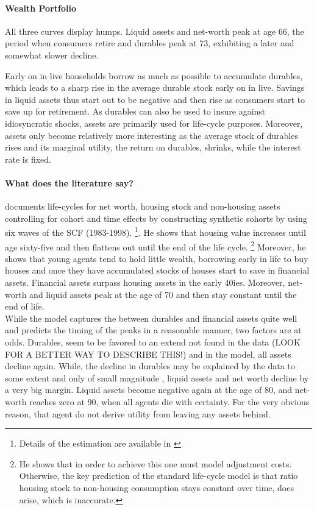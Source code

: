 \documentclass[a4paper,12pt]{article}
\begin{document}
\paragraph{Wealth Portfolio} All three curves display humps. Liquid assets and net-worth peak at age 66, the period when consumers retire and durables peak at 73, exhibiting a later and somewhat slower decline. 

Early on in live households borrow as much as possible to accumulate durables, which leads to a sharp rise in the average durable stock early on in live. Savings in liquid assets thus start out to be negative and then rise as consumers start to save up for retirement. As durables can also be used to insure against idiosyncratic shocks, assets are primarily used for life-cycle purposes. Moreover, assets only become relatively more interesting as the average stock of durables rises and its marginal utility, the return on durables, shrinks, while the interest rate is fixed. 

\paragraph{What does the literature say?} \cite{yang2009} documents life-cycles for net worth, housing stock and non-housing assets controlling for cohort and time effects by constructing synthetic sohorts by using six waves of the SCF (1983-1998). \footnote{Details of the estimation are available in \cite{yang2009}}. He shows that housing value increases until age sixty-five and then flattens out until the end of the life cycle. \footnote{He shows that in order to achieve this one must model adjustment costs. Otherwise, the key prediction of the standard life-cycle model is that ratio housing stock to non-housing consumption stays constant over time, does arise, which is inaccurate. } Moreover, he shows that young agents tend to hold little wealth, borrowing early in life to buy houses and once they have accumulated stocks of houses start to save in financial assets. Financial assets surpass housing assets in the early 40ies. Moreover, net-worth and liquid assets peak at the age of 70 and then stay constant until the end of life. \\

While the model captures the between durables and financial assets quite well and predicts the timing of the peaks in a reasonable manner, two factors are at odds. Durables, seem to be favored to an extend not found in the data (LOOK FOR A BETTER WAY TO DESCRIBE THIS!) and in the model, all assets decline again. While, the decline in durables may be explained by the data to some extent and only of small magnitude \citep{FV&K2011}, liquid assets and net worth decline by a very big margin. Liquid assets become negative again at the age of 80, and net-worth reaches zero at 90, when all agents die with certainty. For the very obvious reason, that agent do not derive utility from leaving any assets behind.  
\end{document}
